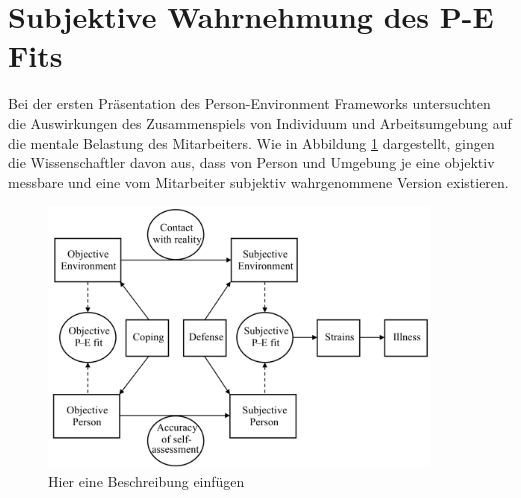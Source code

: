 \section{Subjektive Wahrnehmung des P-E Fits}
\label{ch:personEnvironmentFit:subjektivObjektiv}
Bei der ersten Präsentation des Person-Environment Frameworks untersuchten \textcite{copingAndAdaption:1974} die Auswirkungen des Zusammenspiels von Individuum und Arbeitsumgebung auf die mentale Belastung des Mitarbeiters. Wie in Abbildung \ref{fig:personEnvironmentFit:subjektivObjektiv:abb1} dargestellt, gingen die Wissenschaftler davon aus, dass von Person und Umgebung je eine objektiv messbare und eine vom Mitarbeiter subjektiv wahrgenommene Version existieren. \\
\begin{figure}[h]
	\centering
	\includegraphics[width=0.9\textwidth]{gfx/subjektivObjektivPEFit.png}
	\caption{Hier eine Beschreibung einfügen \cite[S. 22]{edwards:2008}}
	\label{fig:personEnvironmentFit:subjektivObjektiv:abb1}
\end{figure}
\\
